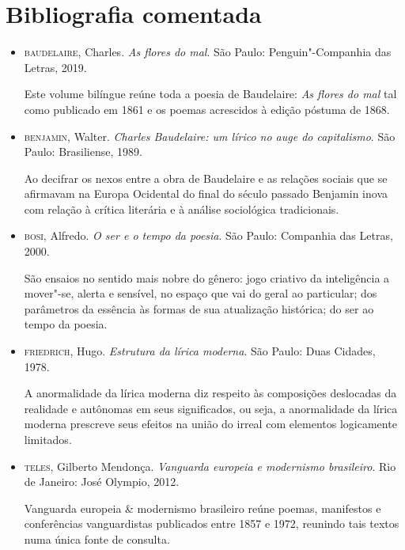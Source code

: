 \documentclass[12pt]{extarticle}
\begin{document}

\section{Bibliografia comentada}

\begin{itemize}
\item\textsc{baudelaire}, Charles. \textit{As flores do mal}. São Paulo:
Penguin"-Companhia das Letras, 2019.

Este volume bilíngue reúne toda a poesia de Baudelaire: \textit{As flores do mal}
tal como publicado em 1861 e os poemas acrescidos à edição póstuma de
1868.

\item\textsc{benjamin}, Walter. \textit{Charles Baudelaire: um lírico no auge do
capitalismo}. São Paulo: Brasiliense, 1989.

Ao decifrar os nexos entre a obra de Baudelaire e as relações sociais
que se afirmavam na Europa Ocidental do final do século passado Benjamin
inova com relação à crítica literária e à análise sociológica
tradicionais.

\item\textsc{bosi}, Alfredo. \textit{O ser e o tempo da poesia}. São Paulo: Companhia
das Letras, 2000.

São ensaios no sentido mais nobre do gênero: jogo criativo da
inteligência a mover"-se, alerta e sensível, no espaço que vai do geral
ao particular; dos parâmetros da essência às formas de sua atualização
histórica; do ser ao tempo da poesia.

\item\textsc{friedrich}, Hugo. \textit{Estrutura da lírica moderna}. São Paulo: Duas
Cidades, 1978.

A anormalidade da lírica moderna diz respeito às composições deslocadas
da realidade e autônomas em seus significados, ou seja, a anormalidade
da lírica moderna prescreve seus efeitos na união do irreal com
elementos logicamente limitados.

\item\textsc{teles}, Gilberto Mendonça. \textit{Vanguarda europeia e modernismo
brasileiro}. Rio de Janeiro: José Olympio, 2012.

Vanguarda europeia \& modernismo brasileiro reúne poemas, manifestos e
conferências vanguardistas publicados entre 1857 e 1972, reunindo tais
textos numa única fonte de consulta.



\end{itemize}
\end{document}
